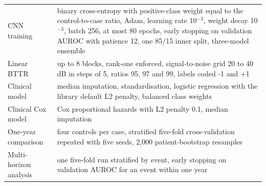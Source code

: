 \documentclass[preprint,12pt]{elsarticle}
\begin{document}
\begin{table}[htbp]
\begin{tabularx}{\textwidth}{@{}L{0.25\textwidth}Y@{}}
CNN training & binary cross-entropy with positive-class weight equal to the control-to-case ratio, Adam, learning rate 10$^{-3}$, weight decay 10$^{-3}$, batch 256, at most 80 epochs, early stopping on validation AUROC with patience 12, one 85/15 inner split, three-model ensemble \\
Linear BTTR & up to 8 blocks, rank-one enforced, signal-to-noise grid 20 to 40 dB in steps of 5, ratios 95, 97 and 99, labels coded -1 and +1 \\
Clinical model & median imputation, standardisation, logistic regression with the library default L2 penalty, balanced class weights \\
Clinical Cox model & Cox proportional hazards with L2 penalty 0.1, median imputation \\
One-year comparison & four controls per case, stratified five-fold cross-validation repeated with five seeds, 2,000 patient-bootstrap resamples \\
Multi-horizon analysis & one five-fold run stratified by event, early stopping on validation AUROC for an event within one year \\
\bottomrule
\end{tabularx}
\end{table}



\end{document}
